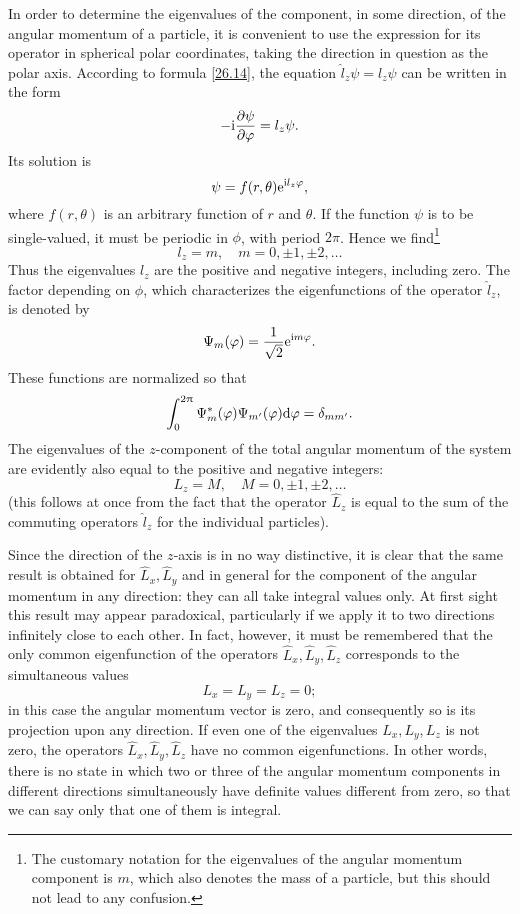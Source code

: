 In order to determine the eigenvalues of the component, in some direction, of the angular momentum of a particle, it is convenient to use the expression for its operator in spherical polar coordinates, taking the direction in question as the polar axis. According to formula \eqref{26.14}, the equation $ \hat{l}_z\psi=l_z\psi $ can be written in the form
\begin{equation}\label{27.1}
-\mathrm{i}\frac{\partial\psi}{\partial\varphi}=l_z\psi.
\end{equation}
Its solution is
\[ \psi=f(r,\theta)\mathrm{e}^{\mathrm{i} l_z\varphi}, \]
where $ f (r, \theta) $ is an arbitrary function of $ r $ and $ \theta $. If the function $\psi$ is to be single-valued, it must be periodic in $\phi$, with period $ 2\pi $. Hence we find\footnote{The customary notation for the eigenvalues of the angular momentum component is $ m $, which also denotes the mass of a particle, but this should not lead to any confusion.}
\begin{equation}\label{27.2}
l_z=m,\quad m=0,\pm 1,\pm 2,\dots
\end{equation}
Thus the eigenvalues $ l_z $ are the positive and negative integers, including zero. The factor depending on $\phi$, which characterizes the eigenfunctions of the operator $ \hat{l}_z $, is denoted by
\begin{equation}\label{27.3}
\Psi_m(\varphi)=\frac{1}{\sqrt{2}}\mathrm{e}^{\mathrm{i} m\varphi}.
\end{equation}
These functions are normalized so that
\begin{equation}\label{27.4}
\int_{0}^{2\uppi}\Psi_m^*(\varphi)\Psi_{m'}(\varphi)\mathrm{d}\varphi=\delta_{mm'}.
\end{equation}
The eigenvalues of the $ z $-component of the total angular momentum of the system are evidently also equal to the positive and negative integers:
\begin{equation}\label{27.5}
L_z=M,\quad M=0,\pm 1,\pm 2,\dots
\end{equation}
(this follows at once from the fact that the operator $ \hat{L}_z $ is equal to the sum of the commuting operators $ \hat{l}_z $ for the individual particles).

Since the direction of the $ z $-axis is in no way distinctive, it is clear that the same result is obtained for $ \hat{L}_x,\hat{L}_y $ and in general for the component of the angular momentum in any direction: they can all take integral values only. At first sight this result may appear paradoxical, particularly if we apply it to two directions infinitely close to each other. In fact, however, it must be remembered that the only common eigenfunction of the operators $ \hat{L}_x,\hat{L}_y,\hat{L}_z $ corresponds to the simultaneous values
\[ {L}_x={L}_y={L}_z=0; \]
in this case the angular momentum vector is zero, and consequently so is its projection upon any direction. If even one of the eigenvalues $ {L}_x,{L}_y,{L}_z $ is not zero, the operators $ \hat{L}_x,\hat{L}_y,\hat{L}_z $ have no common eigenfunctions. In other words, there is no state in which two or three of the angular momentum components in different directions simultaneously have definite values different from zero, so that we can say only that one of them is integral.

